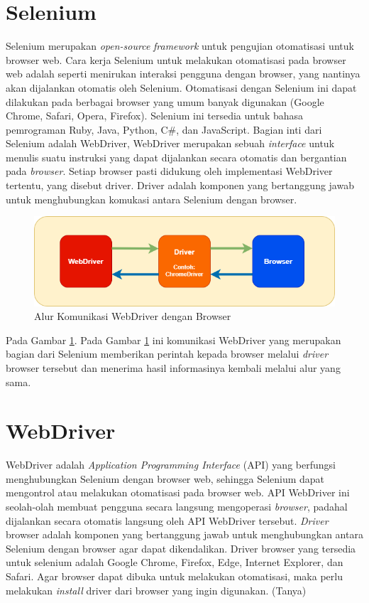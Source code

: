 \section{Selenium}
\label{sec:selenium}
Selenium merupakan \textit{open-source} \textit{framework} untuk pengujian otomatisasi untuk browser web\cite{selenium}. Cara kerja Selenium untuk melakukan otomatisasi pada browser web adalah seperti menirukan interaksi pengguna dengan browser, yang nantinya akan dijalankan otomatis oleh Selenium. Otomatisasi dengan Selenium ini dapat dilakukan pada berbagai browser yang umum banyak digunakan (Google Chrome, Safari, Opera, Firefox). Selenium ini tersedia untuk bahasa pemrograman Ruby, Java, Python, C\#, dan JavaScript. Bagian inti dari Selenium adalah WebDriver, WebDriver merupakan sebuah \textit{interface} untuk menulis suatu instruksi yang dapat dijalankan secara otomatis dan bergantian pada \textit{browser}. Setiap browser pasti didukung oleh implementasi WebDriver tertentu, yang disebut driver. Driver adalah komponen yang bertanggung jawab untuk menghubungkan komukasi antara Selenium dengan browser. 
\begin{figure}[H]
	\centering
	\includegraphics[scale=0.7]{Gambar/flowSelenium.png}
	\caption{Alur Komunikasi WebDriver dengan Browser} 
	\label{fig:flowSelenium}
\end{figure}
Pada Gambar \ref{fig:flowSelenium}. Pada Gambar \ref{fig:flowSelenium} ini komunikasi WebDriver yang merupakan bagian dari Selenium memberikan perintah kepada browser melalui \textit{driver} browser tersebut dan menerima hasil informasinya kembali melalui alur yang sama.

\section{WebDriver}
\label{sec:webdriver}
WebDriver adalah \textit{Application Programming Interface} (API) yang berfungsi menghubungkan Selenium dengan browser web, sehingga Selenium dapat mengontrol atau melakukan otomatisasi pada browser web\cite{selenium}. API WebDriver ini seolah-olah membuat pengguna secara langsung mengoperasi \textit{browser}, padahal dijalankan secara otomatis langsung oleh API WebDriver tersebut. 
\textit{Driver} browser adalah komponen yang bertanggung jawab untuk menghubungkan antara Selenium dengan browser agar dapat dikendalikan. Driver browser yang tersedia untuk selenium adalah Google Chrome, Firefox, Edge, Internet Explorer, dan Safari. Agar browser dapat dibuka untuk melakukan otomatisasi, maka perlu melakukan \textit{install} driver dari browser yang ingin digunakan. (Tanya)

